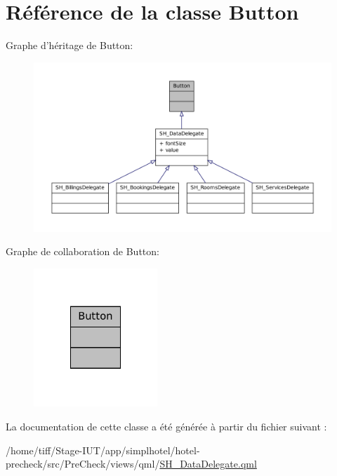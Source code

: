 \hypertarget{classButton}{\section{Référence de la classe Button}
\label{classButton}
}


Graphe d'héritage de Button\-:\nopagebreak
\begin{figure}[H]
\begin{center}
\leavevmode
\includegraphics[width=350pt]{classButton__inherit__graph}
\end{center}
\end{figure}


Graphe de collaboration de Button\-:\nopagebreak
\begin{figure}[H]
\begin{center}
\leavevmode
\includegraphics[width=132pt]{classButton__coll__graph}
\end{center}
\end{figure}


La documentation de cette classe a été générée à partir du fichier suivant \-:\begin{DoxyCompactItemize}
\item 
/home/tiff/\-Stage-\/\-I\-U\-T/app/simplhotel/hotel-\/precheck/src/\-Pre\-Check/views/qml/\hyperlink{SH__DataDelegate_8qml}{S\-H\-\_\-\-Data\-Delegate.\-qml}\end{DoxyCompactItemize}
